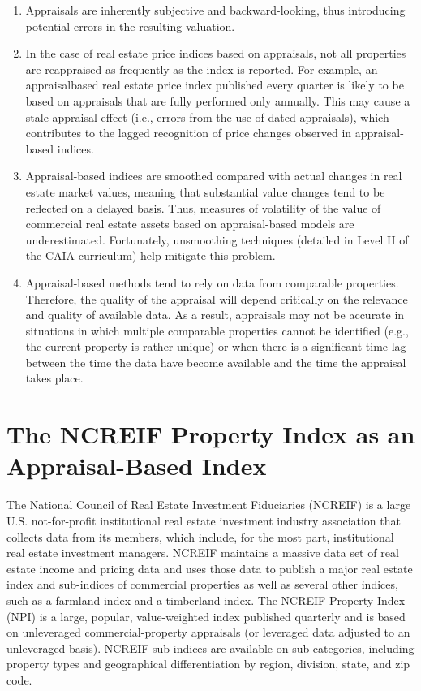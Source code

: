 \documentclass[11pt]{article}
\begin{document}
\begin{enumerate}
  \item Appraisals are inherently subjective and backward-looking, thus introducing potential errors in the resulting valuation.

  \item In the case of real estate price indices based on appraisals, not all properties are reappraised as frequently as the index is reported. For example, an appraisalbased real estate price index published every quarter is likely to be based on appraisals that are fully performed only annually. This may cause a stale appraisal effect (i.e., errors from the use of dated appraisals), which contributes to the lagged recognition of price changes observed in appraisal-based indices.

  \item Appraisal-based indices are smoothed compared with actual changes in real estate market values, meaning that substantial value changes tend to be reflected on a delayed basis. Thus, measures of volatility of the value of commercial real estate assets based on appraisal-based models are underestimated. Fortunately, unsmoothing techniques (detailed in Level II of the CAIA curriculum) help mitigate this problem.

  \item Appraisal-based methods tend to rely on data from comparable properties. Therefore, the quality of the appraisal will depend critically on the relevance and quality of available data. As a result, appraisals may not be accurate in situations in which multiple comparable properties cannot be identified (e.g., the current property is rather unique) or when there is a significant time lag between the time the data have become available and the time the appraisal takes place.

\end{enumerate}

\section*{The NCREIF Property Index as an Appraisal-Based Index}
The National Council of Real Estate Investment Fiduciaries (NCREIF) is a large U.S. not-for-profit institutional real estate investment industry association that collects data from its members, which include, for the most part, institutional real estate investment managers. NCREIF maintains a massive data set of real estate income and pricing data and uses those data to publish a major real estate index and sub-indices of commercial properties as well as several other indices, such as a farmland index and a timberland index. The NCREIF Property Index (NPI) is a large, popular, value-weighted index published quarterly and is based on unleveraged commercial-property appraisals (or leveraged data adjusted to an unleveraged basis). NCREIF sub-indices are available on sub-categories, including property types and geographical differentiation by region, division, state, and zip code.
\end{document}
